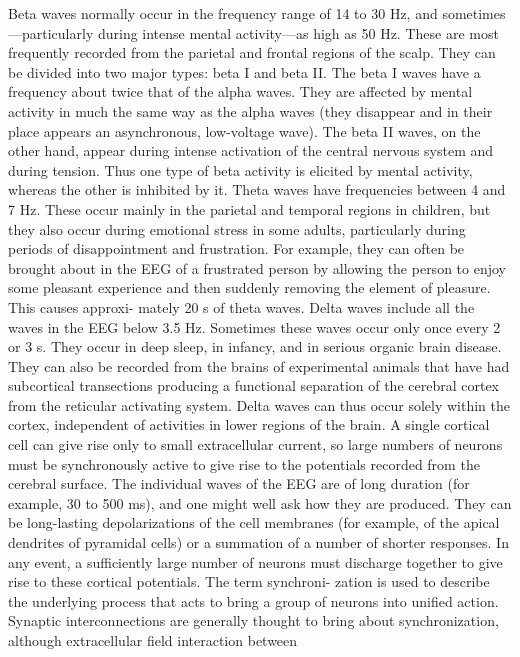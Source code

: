 Beta waves normally occur in the frequency range of 14 to 30 Hz, and
sometimes—particularly during intense mental activity—as high as 50 Hz.
These are most frequently recorded from the parietal and frontal regions of the
scalp. They can be divided into two major types: beta I and beta II. The beta I
waves have a frequency about twice that of the alpha waves. They are affected
by mental activity in much the same way as the alpha waves (they disappear
and in their place appears an asynchronous, low-voltage wave). The beta II
waves, on the other hand, appear during intense activation of the central
nervous system and during tension. Thus one type of beta activity is elicited by
mental activity, whereas the other is inhibited by it.
Theta waves have frequencies between 4 and 7 Hz. These occur mainly in
the parietal and temporal regions in children, but they also occur during
emotional stress in some adults, particularly during periods of disappointment
and frustration. For example, they can often be brought about in the EEG of a
frustrated person by allowing the person to enjoy some pleasant experience
and then suddenly removing the element of pleasure. This causes approxi-
mately 20 s of theta waves.
Delta waves include all the waves in the EEG below 3.5 Hz. Sometimes
these waves occur only once every 2 or 3 s. They occur in deep sleep, in infancy,
and in serious organic brain disease. They can also be recorded from the brains
of experimental animals that have had subcortical transections producing a
functional separation of the cerebral cortex from the reticular activating
system. Delta waves can thus occur solely within the cortex, independent of
activities in lower regions of the brain.
A single cortical cell can give rise only to small extracellular current, so large
numbers of neurons must be synchronously active to give rise to the potentials
recorded from the cerebral surface. The individual waves of the EEG are of long
duration (for example, 30 to 500 ms), and one might well ask how they are
produced. They can be long-lasting depolarizations of the cell membranes (for
example, of the apical dendrites of pyramidal cells) or a summation of a number
of shorter responses. In any event, a sufficiently large number of neurons must
discharge together to give rise to these cortical potentials. The term synchroni-
zation is used to describe the underlying process that acts to bring a group of
neurons into unified action. Synaptic interconnections are generally thought to
bring about synchronization, although extracellular field interaction between

